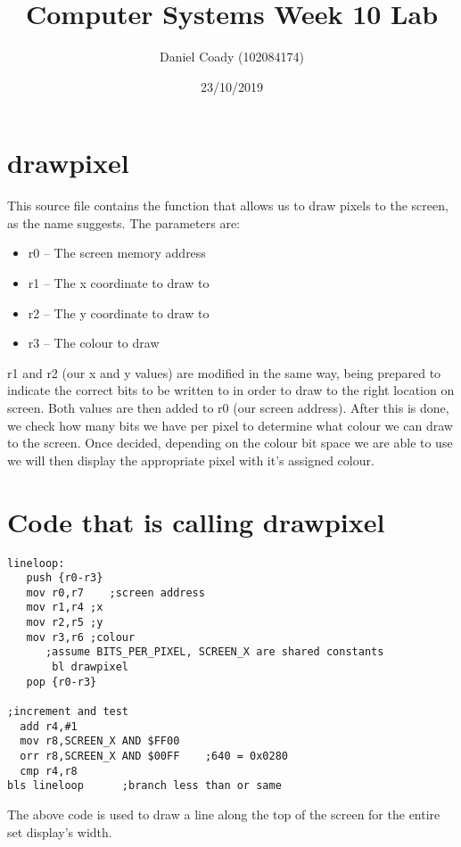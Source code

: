 \documentclass[11pt]{scrartcl}
\title{Computer Systems Week 10 Lab}
\author{Daniel Coady (102084174)}
\date{23/10/2019}
\begin{document}
\maketitle

\section*{drawpixel}
This source file contains the function that allows us to draw pixels to
the screen, as the name suggests. The parameters are:
\begin{itemize}
  \item r0 -- The screen memory address
  \item r1 -- The x coordinate to draw to
  \item r2 -- The y coordinate to draw to
  \item r3 -- The colour to draw
\end{itemize}
r1 and r2 (our x and y values) are modified in the same way, being
prepared to indicate the correct bits to be written to in order to draw
to the right location on screen. Both values are then added to r0 (our
screen address). After this is done, we check how many bits we have per
pixel to determine what colour we can draw to the screen. Once decided,
depending on the colour bit space we are able to use we will then display
the appropriate pixel with it's assigned colour.

\section*{Code that is calling drawpixel}
\begin{verbatim}
lineloop:
   push {r0-r3}
   mov r0,r7    ;screen address
   mov r1,r4 ;x
   mov r2,r5 ;y
   mov r3,r6 ;colour
      ;assume BITS_PER_PIXEL, SCREEN_X are shared constants
       bl drawpixel
   pop {r0-r3}

;increment and test
  add r4,#1
  mov r8,SCREEN_X AND $FF00
  orr r8,SCREEN_X AND $00FF    ;640 = 0x0280
  cmp r4,r8
bls lineloop      ;branch less than or same
\end{verbatim}
The above code is used to draw a line along the top of the screen for the
entire set display's width.
\end{document}
